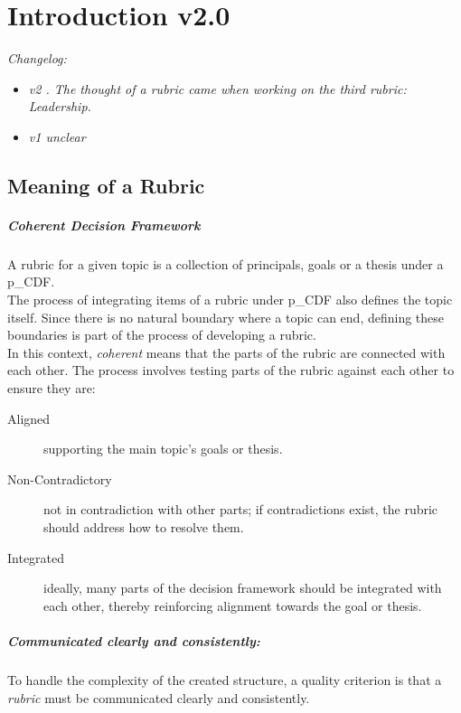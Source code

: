 \chapter{Introduction v2.0}
\setcounter{section}{0}
\textit{Changelog:}\\
\begin{itemize}
	\item \textit{v2 \textbf{}. The thought of a rubric came when working on the third rubric: Leadership.}
	\item \textit{v1 unclear}
\end{itemize}

\section{Meaning of a Rubric} \label{sec:Rubric}
\paragraph{Coherent Decision Framework}

A rubric for a given topic is a collection of principals, goals or a thesis under a \gls{p_CDF}.\\

The process of integrating items of a rubric under \gls{p_CDF} also defines the topic itself. Since there is no natural boundary where a topic can end, defining these boundaries is part of the process of developing a rubric.\\

In this context, \textit{coherent} means that the parts of the rubric are connected with each other. The process involves testing parts of the rubric against each other to ensure they are:
\begin{description}
    \item[Aligned] supporting the main topic's goals or thesis.
    \item[Non-Contradictory] not in contradiction with other parts; if contradictions exist, the rubric should address how to resolve them.
    \item[Integrated] ideally, many parts of the decision framework should be integrated with each other, thereby reinforcing alignment towards the goal or thesis.
\end{description}

\paragraph{Communicated clearly and consistently:}
To handle the complexity of the created structure, a quality criterion is that a \textit{rubric} must be communicated clearly and consistently.

